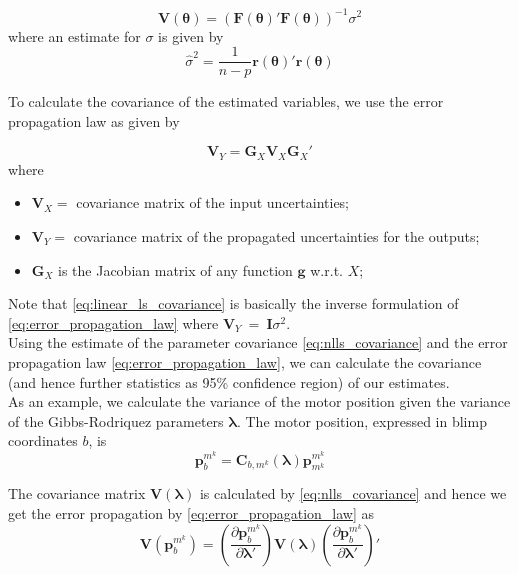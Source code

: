 \begin{equation}
\label{eq:nlls_covariance}
\mathbf{V}(\boldsymbol{\theta}) = (\mathbf{F}(\boldsymbol{\theta})'\mathbf{F}(\boldsymbol{\theta})) ^{-1} \sigma^2
\end{equation}
where an estimate for $\sigma$ is given by
\begin{equation}
\hat{\sigma}^2 = \frac{1}{n-p} \mathbf{r}(\boldsymbol{\theta})' \mathbf{r}(\boldsymbol{\theta})
\end{equation}

To calculate the covariance of the estimated variables, we use the error propagation law as given by \citet[eq. 4.15]{Siegwart}

\begin{equation}
\label{eq:error_propagation_law}
\mathbf{V}_Y = \mathbf{G}_X \mathbf{V}_X \mathbf{G}_X'
\end{equation}
where
\begin{itemize}
\item[] $\mathbf{V}_X =$ covariance matrix of the input uncertainties;
\item[] $\mathbf{V}_Y =$ covariance matrix of the propagated uncertainties for the outputs;
\item[] $\mathbf{G}_X  $ is the Jacobian matrix of any function $\mathbf{g}$ w.r.t. $X$;
\end{itemize}

Note that \cref{eq:linear_ls_covariance} is basically the inverse formulation of \cref{eq:error_propagation_law} where $\mathbf{V}_Y~=~\mathbf{I} \sigma^2$.
\\

Using the estimate of the parameter covariance \cref{eq:nlls_covariance} and the error propagation law \cref{eq:error_propagation_law}, we can calculate the covariance (and hence further statistics as 95\% confidence region) of our estimates.
\\

As an example, we calculate the variance of the motor position given the variance of the Gibbs-Rodriquez parameters $\boldsymbol{\lambda}$.
The motor position, expressed in blimp coordinates $b$, is
\begin{equation}
\mathbf{p}^{m^k}_b = \mathbf{C}_{b,m^k}(\boldsymbol{\lambda}) \mathbf{p}^{m^k}_{m^k}
\end{equation}

The covariance matrix $\mathbf{V}(\boldsymbol{\lambda})$ is calculated by \cref{eq:nlls_covariance} and hence we get the error propagation by \cref{eq:error_propagation_law} as
\begin{equation}
\mathbf{V} (\mathbf{p}^{m^k}_b) = 
\left(\frac{\partial \mathbf{p}^{m^k}_b}{\partial \boldsymbol{\lambda}'}\right)
\mathbf{V}(\boldsymbol{\lambda})
\left(\frac{\partial \mathbf{p}^{m^k}_b}{\partial \boldsymbol{\lambda}'}\right)'
\end{equation}

